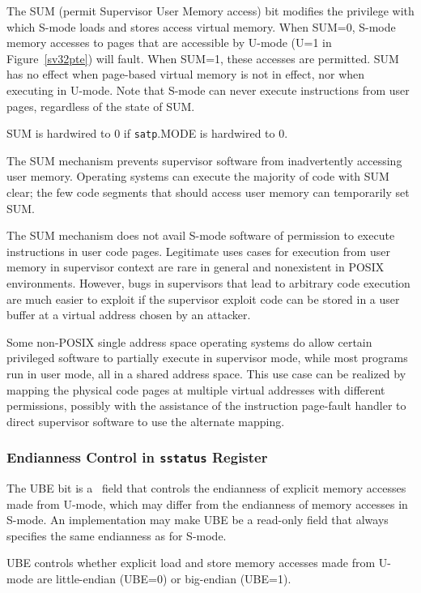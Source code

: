The SUM (permit Supervisor User Memory access) bit modifies the privilege with
which S-mode loads and stores access virtual memory.
When SUM=0, S-mode memory accesses to pages that are accessible by U-mode (U=1
in Figure~\ref{sv32pte}) will fault.  When SUM=1, these accesses are permitted.
SUM has no effect when page-based virtual memory is not in effect, nor when
executing in U-mode.  Note that S-mode can never execute instructions from user
pages, regardless of the state of SUM.

SUM is hardwired to 0 if {\tt satp}.MODE is hardwired to 0.

\begin{commentary}
The SUM mechanism prevents supervisor software from inadvertently accessing
user memory.  Operating systems can execute the majority of code with SUM clear;
the few code segments that should access user memory can temporarily set
SUM.

The SUM mechanism does not avail S-mode software of permission to execute
instructions in user code pages.  Legitimate uses cases for execution from
user memory in supervisor context are rare in general and nonexistent in POSIX
environments.  However, bugs in supervisors that lead to arbitrary code
execution are much easier to exploit if the supervisor exploit code can be
stored in a user buffer at a virtual address chosen by an attacker.

Some non-POSIX single address space operating systems do allow certain
privileged software to partially execute in supervisor mode, while most
programs run in user mode, all in a shared address space.  This use case can
be realized by mapping the physical code pages at multiple virtual addresses
with different permissions, possibly with the assistance of the
instruction page-fault handler to direct supervisor software to use the
alternate mapping.
\end{commentary}

\subsubsection{Endianness Control in {\tt sstatus} Register}

The UBE bit is a \warl\ field that controls the endianness of explicit
memory accesses made from U-mode, which may differ from the endianness of
memory accesses in S-mode.
An implementation may make UBE be a read-only field that always specifies
the same endianness as for S-mode.

UBE controls whether explicit
load and store memory accesses made from U-mode are little-endian (UBE=0)
or big-endian (UBE=1).

